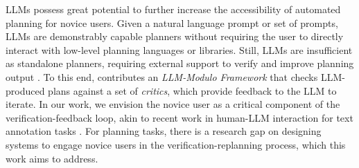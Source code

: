 LLMs possess great potential to further increase the accessibility of automated planning for novice users.
Given a natural language prompt or set of prompts, LLMs are demonstrably capable planners \cite{silverLLM2024, songLLMPlan2023, lu2023plug} without requiring the user to directly interact with low-level planning languages or libraries. Still, LLMs are insufficient as standalone planners, requiring external support to verify and improve planning output \cite{pmlr-v235-kambhampati24a}.
To this end, \citet{gundawar2024robustplanningllmmoduloframework} contributes an \textit{LLM-Modulo Framework} that checks LLM-produced plans against a set of \textit{critics}, which provide feedback to the LLM to iterate. In our work, we envision the novice user as a critical component of the verification-feedback loop, akin to recent work in human-LLM interaction for text annotation tasks \cite{wang2024LLM}. For planning tasks, there is a research gap on designing systems to engage novice users in the verification-replanning process, which this work aims to address.

